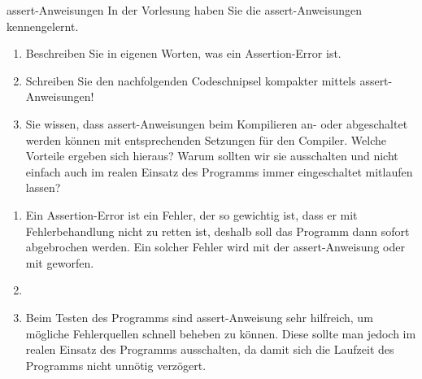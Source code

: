 \documentclass{../preamble}
\begin{document}
\begin{task}[credit = \stars{1}{3}]{assert-Anweisungen}
    In der Vorlesung haben Sie die assert-Anweisungen kennengelernt.
    \begin{enumerate}
        \item Beschreiben Sie in eigenen Worten, was ein Assertion-Error ist.
        \item Schreiben Sie den nachfolgenden Codeschnipsel kompakter mittels assert-Anweisungen!
              
        \item  Sie wissen, dass assert-Anweisungen beim Kompilieren an- oder abgeschaltet werden können mit entsprechenden Setzungen für den Compiler. Welche Vorteile ergeben sich hieraus? Warum sollten wir sie ausschalten und nicht einfach auch im realen Einsatz des Programms immer eingeschaltet mitlaufen lassen?
    \end{enumerate}

    \begin{solution}
        \begin{solution}
            \begin{enumerate}
                \item Ein Assertion-Error ist ein Fehler, der so gewichtig ist, dass er mit Fehlerbehandlung nicht zu retten ist, deshalb soll das Programm dann sofort abgebrochen werden. Ein solcher Fehler wird mit der \textcolor{keywordcolor}{assert}-Anweisung oder mit  geworfen.
                \item\hfill
                      
                \item Beim Testen des Programms sind \textcolor{keywordcolor}{assert}-Anweisung sehr hilfreich, um mögliche Fehlerquellen schnell beheben zu können. Diese sollte man jedoch im realen Einsatz des Programms ausschalten, da damit sich die Laufzeit des Programms nicht unnötig verzögert.
            \end{enumerate}
        \end{solution}
    \end{solution}
\end{task}

\clearpage
\end{document}
